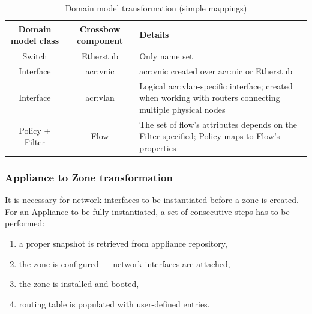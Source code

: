 \documentclass[11pt]{book}
\begin{document}
          \begin{table}[H]

            \centering

            \begin{tabularx}{\textwidth}{|c|c|X|}
              \hline
              Domain model class & Crossbow component & \centering Details \tabularnewline
              \hline \hline
              Switch             & Etherstub          & Only name set \\
              \hline
              Interface          & \gls{acr:vnic}     & \gls{acr:vnic} created over \gls{acr:nic} or Etherstub \\
              \hline
              Interface          & \gls{acr:vlan}     & Logical \gls{acr:vlan}-specific interface; created when working
                                                        with routers connecting multiple physical nodes \\
              \hline
              Policy + Filter    & Flow               & The set of flow's attributes depends on the Filter specified;
                                                        Policy maps to Flow's properties \\
              \hline
            \end{tabularx}

            \caption{Domain model transformation (simple mappings)}
            \label{tab:impl:simple-mapping}

          \end{table}


        \subsubsection{Appliance to Zone transformation}

          It is necessary for network interfaces to be instantiated before a zone is created. For an Appliance to be
          fully instantiated, a set of consecutive steps has to be performed:

          \begin{enumerate}
            \item a proper snapshot is retrieved from appliance repository,
            \item the zone is configured --- network interfaces are attached,
            \item the zone is installed and booted,
            \item routing table is populated with user-defined entries.
          \end{enumerate}
\end{document}
